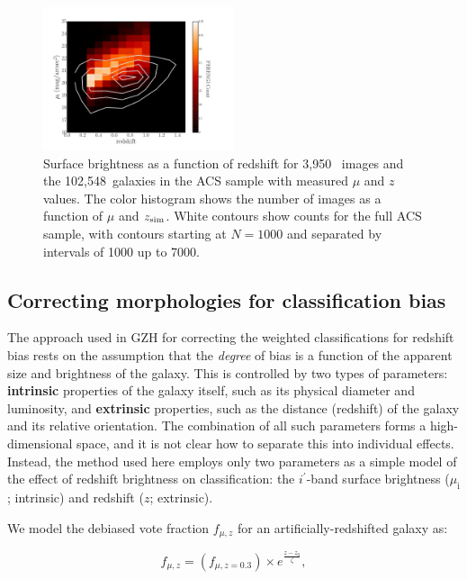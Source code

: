 \documentclass[twocolumn]{aastex6}
\begin{document}
\begin{figure}
\begin{center}
\includegraphics[width=0.5\textwidth]{figures/sb_redshift.pdf}
\caption{Surface brightness as a function of redshift for 3,950~\ferengi{}
images and the 102,548~galaxies in the ACS sample with measured $\mu$ and $z$
values. The color histogram shows the number of \ferengi{} images as a function
of $\mu$ and $z_{\rm sim}$. White contours show counts for the full ACS sample,
with contours starting at $N=1000$ and separated by intervals of 1000 up to
7000.} 
\label{fig:sb_redshift}
\end{center}
\end{figure}

\subsection{Correcting morphologies for classification bias}\label{ssec:zeta}

The approach used in GZH for correcting the weighted classifications for
redshift bias rests on the assumption that the \emph{degree} of bias is a
function of the apparent size and brightness of the galaxy.
This is controlled by two types of parameters: \textbf{intrinsic} properties of
the galaxy itself, such as its physical diameter and luminosity, and
\textbf{extrinsic} properties, such as the distance (redshift) of the galaxy
and its relative orientation. The combination of all
such parameters forms a high-dimensional space, and it is not clear how to
separate this into individual effects. Instead, the method used here employs
only two parameters as a simple model of the effect of redshift brightness on classification: the
$i^\prime$-band surface brightness ($\mu_\mathrm{i}$; intrinsic) and redshift ($z$;
extrinsic). 

We model the debiased vote fraction $f_{\mu,z}$ for an
artificially-redshifted galaxy as:

\begin{equation}
f_{\mu,z} = \left(f_{\mu,z=0.3}\right) \times e^{{\frac{z-z_0}{\zeta}}},
\label{eqn:fzeta}
\end{equation}
\end{document}
